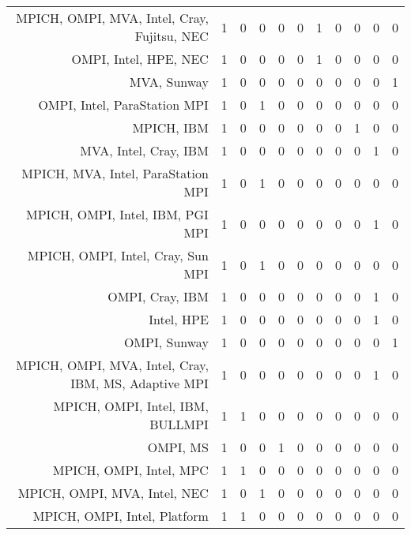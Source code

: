 {\begin{landscape}
\begin{longtable}[htb]{r|c|c|c|c|c|c|c|c|c|c}
{MPICH, OMPI, MVA, Intel, Cray, Fujitsu, NEC} & 1 & 0 & 0 & 0 & 0 & 1 & 0 & 0 & 0 & 0 \\%
{OMPI, Intel, HPE, NEC} & 1 & 0 & 0 & 0 & 0 & 1 & 0 & 0 & 0 & 0 \\%
{MVA, Sunway} & 1 & 0 & 0 & 0 & 0 & 0 & 0 & 0 & 0 & 1 \\%
{OMPI, Intel, ParaStation MPI} & 1 & 0 & 1 & 0 & 0 & 0 & 0 & 0 & 0 & 0 \\%
{MPICH, IBM} & 1 & 0 & 0 & 0 & 0 & 0 & 0 & 1 & 0 & 0 \\%
{MVA, Intel, Cray, IBM} & 1 & 0 & 0 & 0 & 0 & 0 & 0 & 0 & 1 & 0 \\%
{MPICH, MVA, Intel, ParaStation MPI} & 1 & 0 & 1 & 0 & 0 & 0 & 0 & 0 & 0 & 0 \\%
{MPICH, OMPI, Intel, IBM, PGI MPI} & 1 & 0 & 0 & 0 & 0 & 0 & 0 & 0 & 1 & 0 \\%
{MPICH, OMPI, Intel, Cray, Sun MPI} & 1 & 0 & 1 & 0 & 0 & 0 & 0 & 0 & 0 & 0 \\%
{OMPI, Cray, IBM} & 1 & 0 & 0 & 0 & 0 & 0 & 0 & 0 & 1 & 0 \\%
{Intel, HPE} & 1 & 0 & 0 & 0 & 0 & 0 & 0 & 0 & 1 & 0 \\%
{OMPI, Sunway} & 1 & 0 & 0 & 0 & 0 & 0 & 0 & 0 & 0 & 1 \\%
{MPICH, OMPI, MVA, Intel, Cray, IBM, MS, Adaptive MPI} & 1 & 0 & 0 & 0 & 0 & 0 & 0 & 0 & 1 & 0 \\%
{MPICH, OMPI, Intel, IBM, BULLMPI} & 1 & 1 & 0 & 0 & 0 & 0 & 0 & 0 & 0 & 0 \\%
{OMPI, MS} & 1 & 0 & 0 & 1 & 0 & 0 & 0 & 0 & 0 & 0 \\%
{MPICH, OMPI, Intel, MPC} & 1 & 1 & 0 & 0 & 0 & 0 & 0 & 0 & 0 & 0 \\%
{MPICH, OMPI, MVA, Intel, NEC} & 1 & 0 & 1 & 0 & 0 & 0 & 0 & 0 & 0 & 0 \\%
{MPICH, OMPI, Intel, Platform} & 1 & 1 & 0 & 0 & 0 & 0 & 0 & 0 & 0 & 0 \\%
\hline%
\end{longtable}%
\end{landscape}}%
\clearpage%
